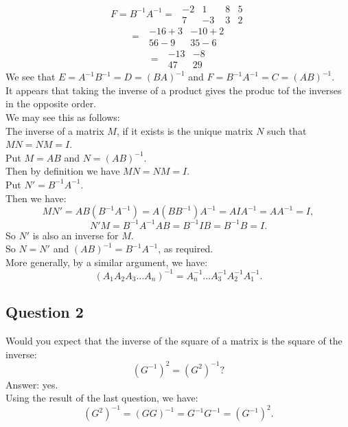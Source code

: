 \documentclass[12pt]{article}
\begin{document}
\[ F = B^{-1}A^{-1} = \hspace{4pt}\begin{array}{|cc|}-2&1\\7&-3\end{array}  \hspace{4pt} \begin{array}{|cc|}8&5\\3&2\end{array}\]
\[ =  \hspace{4pt} \begin{array}{|cc|}-16 + 3&-10 + 2\\56 - 9&35 - 6\end{array}\]
\[ =  \hspace{4pt} \begin{array}{|cc|}-13&-8\\47&29\end{array}\]
We see that $E = A^{-1}B^{-1} = D = (BA)^{-1}$ and $F = B^{-1}A^{-1} = C = (AB)^{-1}$.\\
It appears that taking the inverse of a product gives the produc tof the inverses in the opposite order.\\
We may see this as follows:\\
The inverse of a matrix $M$, if it exists is the unique matrix $N$ such that $MN = NM = I$.\\
Put $M = AB$ and $N = (AB)^{-1}$.\\
Then by definition we have $MN = NM = I$.\\
Put $N' = B^{-1}A^{-1}$.\\
Then we have:
\[ MN' = AB(B^{-1}A^{-1}) = A(BB^{-1})A^{-1} = AIA^{-1} = AA^{-1} = I, \]
\[ N'M = B^{-1}A^{-1}AB = B^{-1}IB = B^{-1}B = I.\]
So $N'$ is also an inverse for $M$.\\
So $N = N'$ and $(AB)^{-1} = B^{-1}A^{-1}$, as required.\\
More generally, by a similar argument, we have:
\[ (A_1A_2A_3\dots A_n)^{-1} = A_n^{-1}\dots A^{-1}_3A^{-1}_2A^{-1}_1.\]  



\subsection*{Question 2}
Would you expect that the inverse of the square of a matrix is the square of the inverse:
\[ (G^{-1})^2 = (G^2)^{-1}?\]
Answer: yes.\\
Using the result of the last question, we have:
\[ (G^2)^{-1} = (GG)^{-1} = G^{-1}G^{-1} = (G^{-1})^2.\]
\end{document}
